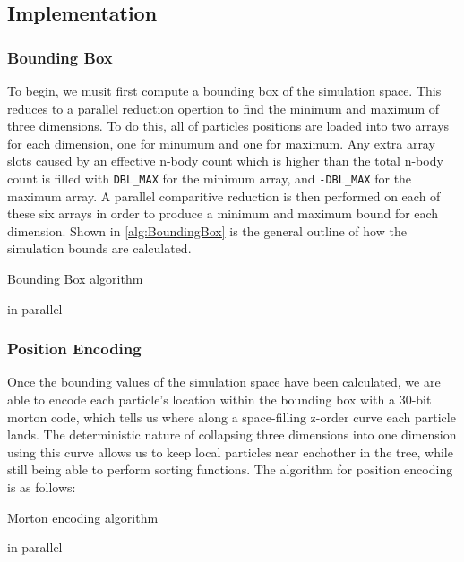 \documentclass{thesis}
\begin{document}
\subsection{Implementation}
\subsubsection{Bounding Box}
To begin, we musit first compute a bounding box of the simulation space. This reduces to a parallel reduction opertion to find the minimum and maximum of three dimensions. To do this, all of particles positions are loaded into two arrays for each dimension, one for minumum and one for maximum. Any extra array slots caused by an effective n-body count which is higher than the total n-body count is filled with \verb|DBL_MAX| for the minimum array, and \verb|-DBL_MAX| for the maximum array. A parallel comparitive reduction is then performed on each of these six arrays in order to produce a minimum and maximum bound for each dimension. Shown in \ref{alg:BoundingBox} is the general outline of how the simulation bounds are calculated. 
\begin{algorithm}
    \label{alg:BoundingBox}
    \caption{Bounding Box algorithm}
    \begin{algorithmic}
             in parallel
            \EndFor
        \EndFor
    \end{algorithmic}
\end{algorithm}
\subsubsection{Position Encoding}
Once the bounding values of the simulation space have been calculated, we are able to encode each particle's location within the bounding box with a 30-bit morton code, which tells us where along a space-filling z-order curve each particle lands. The deterministic nature of collapsing three dimensions into one dimension using this curve allows us to keep local particles near eachother in the tree, while still being able to perform sorting functions. The algorithm for position encoding is as follows:
\begin{algorithm}
    \label{alg:PositionEncoding}
    \caption{Morton encoding algorithm}
    \begin{algorithmic}
         in parallel    
        \EndFor
    \end{algorithmic}
\end{algorithm}
\end{document}
